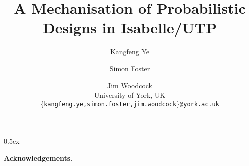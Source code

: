 \documentclass[11pt,a4paper]{article}
\begin{document}
\title{A Mechanisation of Probabilistic Designs in Isabelle/UTP}

\author{Kangfeng Ye \and Simon Foster \and Jim Woodcock \\[.5ex] University of York, UK \\[2ex] \texttt{\small $\{$kangfeng.ye,simon.foster,jim.woodcock$\}$@york.ac.uk}}

\maketitle

\begin{abstract}
     
\end{abstract}

\tableofcontents

\parindent 0pt\parskip 0.5ex

%
%
%
%
%
%
%
%
%
%
%
%

\vspace{4ex}
\noindent\textbf{Acknowledgements}. 

\appendix


%


\vspace{4ex}

\pagebreak 


\end{document}
